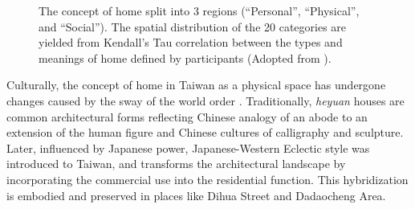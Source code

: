 \begin{figure}[H]
\begin{minipage}{\textwidth}
  \centering
  \hspace*{.2in}
  \caption{The concept of home split into 3 regions (``Personal'', ``Physical'', and ``Social''). The spatial distribution of the 20 categories are yielded from Kendall's Tau correlation between the types and meanings of home defined by participants  (Adopted from \textcite{sixsmith1986meaning}).}
  \label{fig:home_regions}
\end{minipage}
\end{figure}

Culturally, the concept of home in Taiwan as a physical space has undergone changes caused by the sway of the world order \parencite{沈孟穎2015台灣現代住宅設計之轉化}. Traditionally, \textit{heyuan} houses are common architectural forms reflecting Chinese analogy of an abode to an extension of the human figure and Chinese cultures of calligraphy and sculpture. Later, influenced by Japanese power, Japanese-Western Eclectic style was introduced to Taiwan, and  transforms the architectural landscape by incorporating the commercial use into the residential function. This hybridization is embodied and preserved in places like Dihua Street and Dadaocheng Area.

